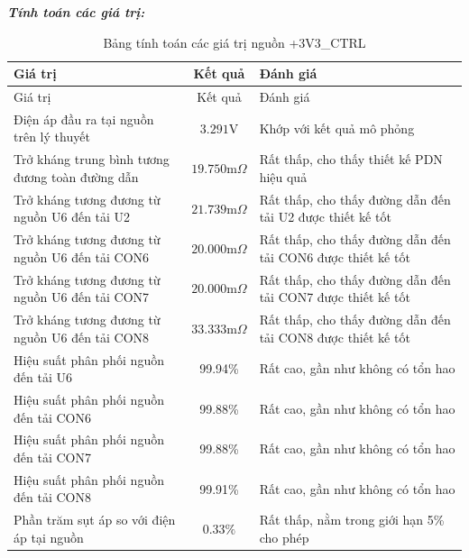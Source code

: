            \textbf{\textit{Tính toán các giá trị:}}
            \begin{longtable}{|p{}|c|p{}|}           
                \caption{Bảng tính toán các giá trị nguồn +3V3\_CTRL}\\
                \hline
                Giá trị & Kết quả & Đánh giá \\
                \hline
                \endfirsthead
                
                \hline
                Giá trị & Kết quả & Đánh giá \\
                \hline
                \endhead
                
                \hline
                \endfoot
                
                \hline
                \endlastfoot
                
                Điện áp đầu ra tại nguồn trên lý thuyết & $3.291\text{V}$ & Khớp với kết quả mô phỏng \\
                Trở kháng trung bình tương đương toàn đường dẫn & $19.750\text{m}\Omega$ & Rất thấp, cho thấy thiết kế PDN hiệu quả \\
                Trở kháng tương đương từ nguồn U6 đến tải U2 & $21.739\text{m}\Omega$ & Rất thấp, cho thấy đường dẫn đến tải U2 được thiết kế tốt \\
                Trở kháng tương đương từ nguồn U6 đến tải CON6 & $20.000\text{m}\Omega$ & Rất thấp, cho thấy đường dẫn đến tải CON6 được thiết kế tốt \\
                Trở kháng tương đương từ nguồn U6 đến tải CON7 & $20.000\text{m}\Omega$ & Rất thấp, cho thấy đường dẫn đến tải CON7 được thiết kế tốt \\
                Trở kháng tương đương từ nguồn U6 đến tải CON8 & $33.333\text{m}\Omega$ & Rất thấp, cho thấy đường dẫn đến tải CON8 được thiết kế tốt \\
                Hiệu suất phân phối nguồn đến tải U6 & 99.94\% & Rất cao, gần như không có tổn hao \\
                Hiệu suất phân phối nguồn đến tải CON6 & 99.88\% & Rất cao, gần như không có tổn hao \\
                Hiệu suất phân phối nguồn đến tải CON7 & 99.88\% & Rất cao, gần như không có tổn hao \\
                Hiệu suất phân phối nguồn đến tải CON8 & 99.91\% & Rất cao, gần như không có tổn hao \\
                Phần trăm sụt áp so với điện áp tại nguồn & $\mathbf{0.33\%}$ & Rất thấp, nằm trong giới hạn 5\% cho phép
                \label{tab:3v3_ctrl_calculation}\\

                \hline
            \end{longtable}

